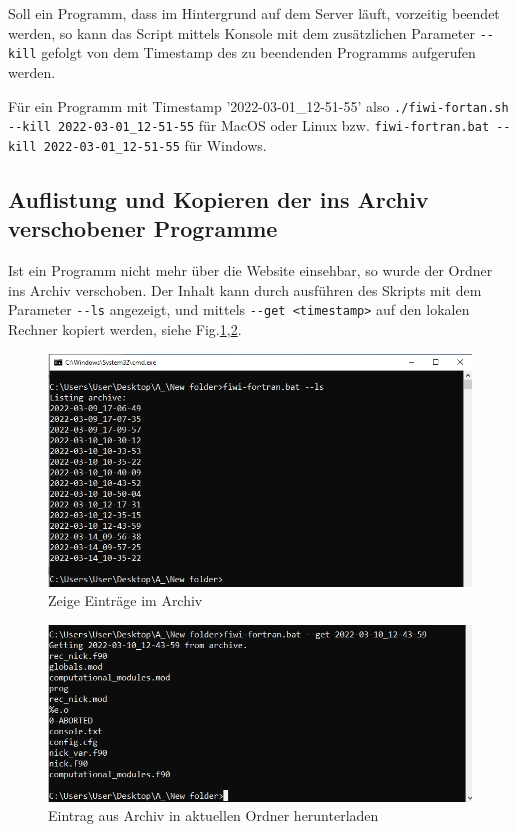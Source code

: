 \documentclass[11pt, a4paper]{article}
\begin{document}
Soll ein Programm, dass im Hintergrund auf dem Server läuft, vorzeitig beendet werden, so kann das Script mittels Konsole mit dem zusätzlichen Parameter \texttt{-{}-kill} gefolgt von dem Timestamp des zu beendenden Programms aufgerufen werden.

Für ein Programm mit Timestamp '2022-03-01\_12-51-55' also
\newline\texttt{./fiwi-fortan.sh -{}-kill 2022-03-01\_12-51-55} für MacOS oder Linux bzw.
\newline\texttt{fiwi-fortran.bat -{}-kill 2022-03-01\_12-51-55} für Windows.

\subsection{Auflistung und Kopieren der ins Archiv verschobener Programme}
Ist ein Programm nicht mehr über die Website einsehbar, so wurde der Ordner ins Archiv verschoben.
Der Inhalt kann durch ausführen des Skripts mit dem Parameter \newline\texttt{-{}-ls} angezeigt, und mittels \newline\texttt{-{}-get <timestamp>} auf den lokalen Rechner kopiert werden, siehe Fig.\ref{fig:script-ls},\ref{fig:script-get}.

\begin{figure}[h]
    \centering
    \includegraphics[width=0.7\linewidth]{./pics/2022-03-16_16-31.png}
    \caption{Zeige Einträge im Archiv}
    \label{fig:script-ls}
\end{figure}
\begin{figure}[h]
    \centering
    \includegraphics[width=0.7\linewidth]{./pics/2022-03-16_16-33_1.png}
    \caption{Eintrag aus Archiv in aktuellen Ordner herunterladen}
    \label{fig:script-get}
\end{figure}
\end{document}
